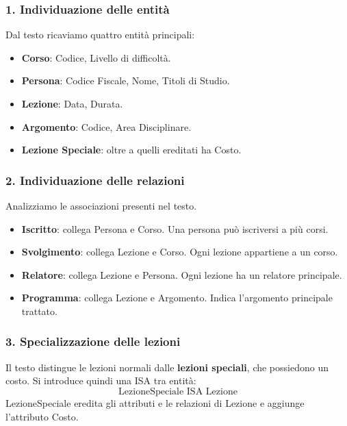 \subsubsection*{1. Individuazione delle entità}

Dal testo ricaviamo quattro entità principali:

\begin{itemize}
    \item \textbf{Corso}: Codice, Livello di difficoltà.
    \item \textbf{Persona}: Codice Fiscale, Nome,
    Titoli di Studio.
    \item \textbf{Lezione}: Data, Durata.
    \item \textbf{Argomento}: Codice, Area Disciplinare.
    \item \textbf{Lezione Speciale}: oltre a quelli ereditati ha Costo.

\end{itemize}

\subsubsection*{2. Individuazione delle relazioni}

Analizziamo le associazioni presenti nel testo.

\begin{itemize}
    \item \textbf{Iscritto}: collega Persona e Corso.
    Una persona può iscriversi a più corsi.

    \item \textbf{Svolgimento}: collega Lezione e Corso.
    Ogni lezione appartiene a un corso.

    \item \textbf{Relatore}: collega Lezione e Persona.
    Ogni lezione ha un relatore principale.

    \item \textbf{Programma}: collega Lezione e Argomento.
    Indica l'argomento principale trattato.
\end{itemize}


\subsubsection*{3. Specializzazione delle lezioni}

Il testo distingue le lezioni normali dalle
\textbf{lezioni speciali}, che possiedono un costo.
Si introduce quindi una ISA tra entità:
\[
\boxed{\text{LezioneSpeciale ISA Lezione}}
\]
LezioneSpeciale eredita gli attributi e le relazioni
di Lezione e aggiunge l'attributo Costo.

